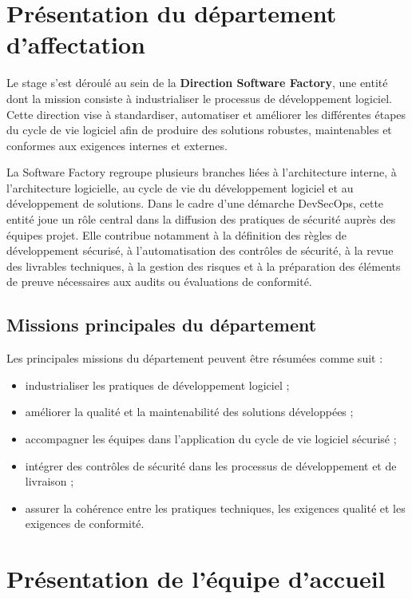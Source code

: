 \documentclass[12pt,a4paper]{report}
\begin{document}
\section{Présentation du département d'affectation}

Le stage s'est déroulé au sein de la \textbf{Direction Software Factory}, une entité dont la mission consiste à industrialiser le processus de développement logiciel. Cette direction vise à standardiser, automatiser et améliorer les différentes étapes du cycle de vie logiciel afin de produire des solutions robustes, maintenables et conformes aux exigences internes et externes.

La Software Factory regroupe plusieurs branches liées à l'architecture interne, à l'architecture logicielle, au cycle de vie du développement logiciel et au développement de solutions. Dans le cadre d'une démarche DevSecOps, cette entité joue un rôle central dans la diffusion des pratiques de sécurité auprès des équipes projet. Elle contribue notamment à la définition des règles de développement sécurisé, à l'automatisation des contrôles de sécurité, à la revue des livrables techniques, à la gestion des risques et à la préparation des éléments de preuve nécessaires aux audits ou évaluations de conformité.

\subsection{Missions principales du département}

Les principales missions du département peuvent être résumées comme suit :

\begin{itemize}
    \item industrialiser les pratiques de développement logiciel ;
    \item améliorer la qualité et la maintenabilité des solutions développées ;
    \item accompagner les équipes dans l'application du cycle de vie logiciel sécurisé ;
    \item intégrer des contrôles de sécurité dans les processus de développement et de livraison ;
    \item assurer la cohérence entre les pratiques techniques, les exigences qualité et les exigences de conformité.
\end{itemize}

\section{Présentation de l'équipe d'accueil}
\end{document}

